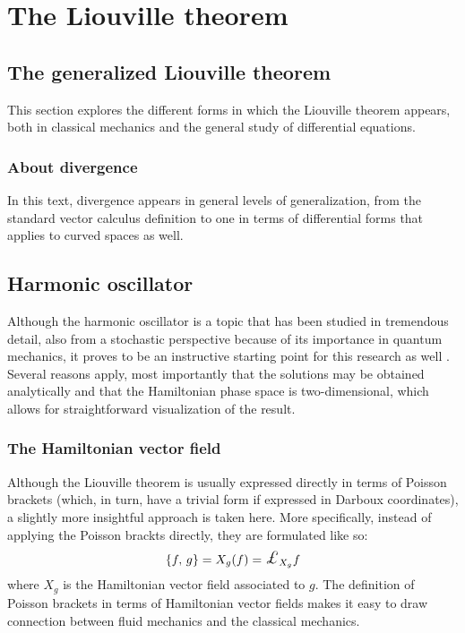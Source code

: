 \chapter{The Liouville theorem}

\section{The generalized Liouville theorem}
This section explores the different forms in which the Liouville theorem appears, both in classical mechanics and the general study of differential equations.

\subsection{About divergence}
In this text, divergence appears in general levels of generalization, from the standard vector calculus definition to one in terms of differential forms that applies to curved spaces as well.

\section{Harmonic oscillator}
Although the harmonic oscillator is a topic that has been studied in tremendous detail, also from a stochastic perspective because of its importance in quantum mechanics, it proves to be an instructive starting point for this research as well \cite{Dekker1975}. Several reasons apply, most importantly that the solutions may be obtained analytically and that the Hamiltonian phase space is two-dimensional, which allows for straightforward visualization of the result.

\subsection{The Hamiltonian vector field}
Although the Liouville theorem is usually expressed directly in terms of Poisson brackets (which, in turn, have a trivial form if expressed in Darboux coordinates), a slightly more insightful approach is taken here. More specifically, instead of applying the Poisson brackts directly, they are formulated like so:
$$ \poisson{f}{g} = X_g(f) = \lied{X_g}{f} $$
where $X_g$ is the Hamiltonian vector field associated to $g$. The definition of Poisson brackets in terms of Hamiltonian vector fields makes it easy to draw connection between fluid mechanics and the classical mechanics.

